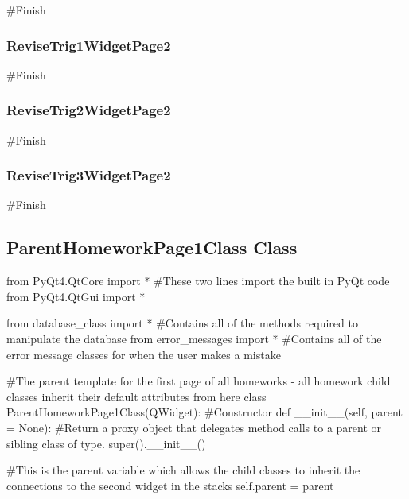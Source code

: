 \begin{landscape}
\begin{python}
#Finish
\end{python}

\subsubsection{ReviseTrig1WidgetPage2}

\begin{python}
#Finish
\end{python}

\subsubsection{ReviseTrig2WidgetPage2}

\begin{python}
#Finish
\end{python}

\subsubsection{ReviseTrig3WidgetPage2}

\begin{python}
#Finish
\end{python}

\subsection{ParentHomeworkPage1Class Class}

\begin{python}
from PyQt4.QtCore import * #These two lines import the built in PyQt code
from PyQt4.QtGui import *

from database_class import * #Contains all of the methods required to manipulate the database
from error_messages import * #Contains all of the error message classes for when the user makes a mistake

#The parent template for the first page of all homeworks - all homework child classes inherit their default attributes from here
class ParentHomeworkPage1Class(QWidget):
    #Constructor
    def __init__(self, parent = None):
        #Return a proxy object that delegates method calls to a parent or sibling class of type.
        super().__init__()

        #This is the parent variable which allows the child classes to inherit the connections to the second widget in the stacks
        self.parent = parent
        

\end{python}
\end{landscape}
